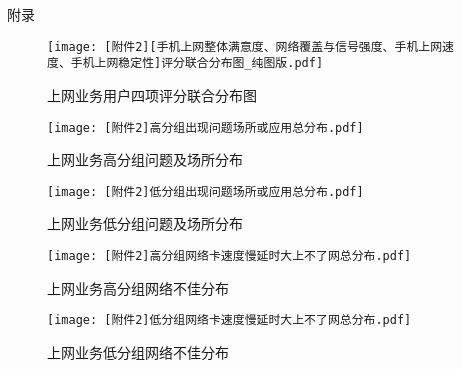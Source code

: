 \documentclass{MathorCupmodeling}
\begin{document}

	\begin{center}
		\heiti{} 附\hspace{2pc}录
	\end{center}

	\begin{figure}[H]
		\centering
			\centering
			\texttt{[image: [附件2][手机上网整体满意度、网络覆盖与信号强度、手机上网速度、手机上网稳定性]评分联合分布图\_纯图版.pdf]}
			\caption{上网业务用户四项评分联合分布图}
			\label{fig:上网业务联合分布图}
	\end{figure}
	\begin{figure}[H]
		\centering
		\begin{minipage}{0.48\linewidth}
			\centering
			\texttt{[image: [附件2]高分组出现问题场所或应用总分布.pdf]}
			\caption{上网业务高分组问题及场所分布}
			\label{fig:上网业务高分组问题及场所分布}
		\end{minipage}
		\begin{minipage}{0.48\linewidth}
			\centering
			\texttt{[image: [附件2]低分组出现问题场所或应用总分布.pdf]}
			\caption{上网业务低分组问题及场所分布}
			\label{fig:上网业务低分组问题及场所分布}
		\end{minipage}
	\end{figure}
	\begin{figure}[H]
		\centering
		\begin{minipage}{0.48\linewidth}
			\centering
			\texttt{[image: [附件2]高分组网络卡速度慢延时大上不了网总分布.pdf]}
			\caption{上网业务高分组网络不佳分布}
			\label{fig:上网业务高分组网络不佳分布}
		\end{minipage}
		\begin{minipage}{0.48\linewidth}
			\centering
			\texttt{[image: [附件2]低分组网络卡速度慢延时大上不了网总分布.pdf]}
			\caption{上网业务低分组网络不佳分布}
			\label{fig:上网业务低分组网络不佳分布}
		\end{minipage}
	\end{figure}
\end{document}

